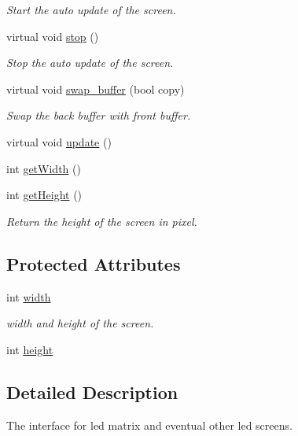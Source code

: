 \begin{DoxyCompactItemize}
\begin{DoxyCompactList}\small\item\em Start the auto update of the screen. \end{DoxyCompactList}\item 
virtual void \hyperlink{class_screen_a38efb55f9bcb9d7181edb580ad7a77fc}{stop} ()
\begin{DoxyCompactList}\small\item\em Stop the auto update of the screen. \end{DoxyCompactList}\item 
virtual void \hyperlink{class_screen_ac609bb9d2adb5d38e077231be25c374d}{swap\+\_\+buffer} (bool copy)
\begin{DoxyCompactList}\small\item\em Swap the back buffer with front buffer. \end{DoxyCompactList}\item 
virtual void \hyperlink{class_screen_ac5346289493d80ddf429ce2369756c14}{update} ()
\item 
int \hyperlink{class_screen_ab71b25e991771611d4acab431f92b518}{get\+Width} ()
\item 
int \hyperlink{class_screen_a4edca55b221da0326dc7de0ec0f4dc91}{get\+Height} ()
\begin{DoxyCompactList}\small\item\em Return the height of the screen in pixel. \end{DoxyCompactList}\end{DoxyCompactItemize}
\subsection*{Protected Attributes}
\begin{DoxyCompactItemize}
\item 
int \hyperlink{class_screen_a49be8f8ccf7ed7a3151a761495c0ce21}{width}
\begin{DoxyCompactList}\small\item\em width and height of the screen. \end{DoxyCompactList}\item 
int \hyperlink{class_screen_a55405920693276db8fbdbf3a903b8d2f}{height}
\end{DoxyCompactItemize}


\subsection{Detailed Description}
The interface for led matrix and eventual other led screens. 

